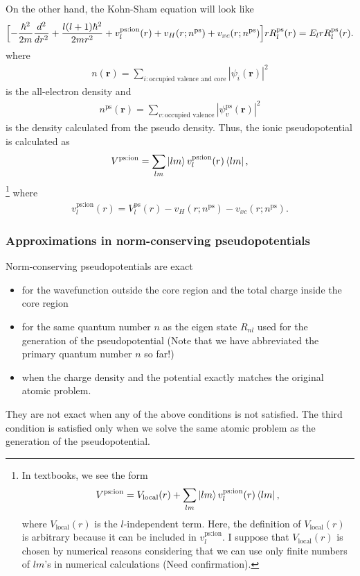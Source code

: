 \documentclass{article}
\begin{document}
On the other hand, the Kohn-Sham equation will look like
\begin{align}
  \Bigl[
    - \frac{\hbar^2}{2m} \frac{d^2}{dr^2} + \frac{l(l+1)\hbar^2}{2mr^2} +  v^{\text{ps:ion}}_l(r) + v_H(r;n^{\text{ps}}) + v_{xc}(r;n^{\text{ps}})
  \Bigr] rR^{\text{ps}}_l(r) = E_l r R^{\text{ps}}_l(r).
\end{align}
where
\begin{align}
  n(\bm{r}) = \sum_{i: \text{occupied valence and core}} |\psi_i (\bm{r}) |^2
\end{align}
is the all-electron density and 
\begin{align}
  n^{\text{ps}}(\bm{r}) = \sum_{v: \text{occupied valence}} |\psi_v^{\text{ps}} (\bm{r}) |^2
\end{align}
is the density calculated from the pseudo density.
Thus, the ionic pseudopotential is calculated as 
\begin{align}
  V^{\text{ps:ion}} = \sum_{lm} \ket{lm} v^{\text{ps:ion}}_l(r)  \bra{lm},
\end{align}
\footnote{In textbooks, we see the form
\begin{align}
  V^{\text{ps:ion}} = V_{\text{local}}(r) + \sum_{lm} \ket{lm} v^{\text{ps:ion}}_l(r)  \bra{lm},
\end{align}
where $V_{\text{local}}(r) $ is the $l$-independent term.
Here, the definition of $V_{\text{local}}(r)$ is arbitrary because it can be included in $v^{\text{ps:ion}}_l$.
I suppose that  $V_{\text{local}}(r)$ is chosen by numerical reasons considering that we can use only finite numbers of $lm$'s in numerical calculations (Need confirmation).
}
where 
\begin{align}
  v^{\text{ps:ion}}_{l}(r) = V^{\text{ps}}_l(r) - v_H(r;n^{\text{ps}}) - v_{xc}(r;n^{\text{ps}}).
\end{align}

\subsubsection{Approximations in norm-conserving pseudopotentials}
Norm-conserving pseudopotentials are exact
\begin{itemize} 
  \item for the wavefunction outside the core region and the total charge inside the core region
  \item for the same quantum number $n$ as the eigen state $R_{nl}$ used for the generation of the pseudopotential (Note that we have abbreviated the primary quantum number $n$ so far!)
  \item when the charge density and the potential exactly matches the original atomic problem.
\end{itemize}
They are not exact when any of the above conditions is not satisfied. The third condition is satisfied only when we solve the same atomic problem as the generation of the pseudopotential.
\end{document}
